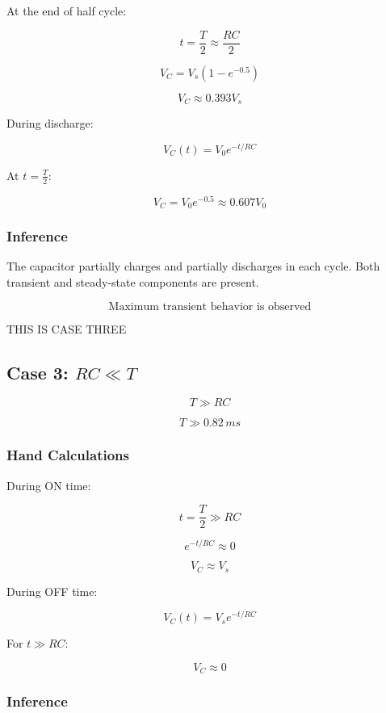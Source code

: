 At the end of half cycle:

\[
t = \frac{T}{2} \approx \frac{RC}{2}
\]

\[
V_C = V_s\left(1 - e^{-0.5}\right)
\]

\[
V_C \approx 0.393V_s
\]

During discharge:

\begin{equation}
V_C(t) = V_0 e^{-t/RC}
\end{equation}

At $t = \frac{T}{2}$:

\[
V_C = V_0 e^{-0.5} \approx 0.607V_0
\]

\subsubsection*{Inference}

The capacitor partially charges and partially discharges in each cycle.  
Both transient and steady-state components are present.

\[
\boxed{\text{Maximum transient behavior is observed}}
\]

THIS IS CASE THREE
\subsection{Case 3: $RC \ll T$}

\[
T \gg RC
\]

\[
T \gg 0.82\,ms
\]

\subsubsection*{Hand Calculations}

During ON time:

\[
t = \frac{T}{2} \gg RC
\]

\[
e^{-t/RC} \approx 0
\]

\[
V_C \approx V_s
\]

During OFF time:

\begin{equation}
V_C(t) = V_s e^{-t/RC}
\end{equation}

For $t \gg RC$:

\[
V_C \approx 0
\]

\subsubsection*{Inference}

